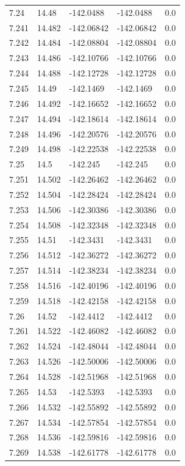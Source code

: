 \begin{tabular}{lllll}
7.24 & 14.48 & -142.0488 & -142.0488 & 0.0 \\
7.241 & 14.482 & -142.06842 & -142.06842 & 0.0 \\
7.242 & 14.484 & -142.08804 & -142.08804 & 0.0 \\
7.243 & 14.486 & -142.10766 & -142.10766 & 0.0 \\
7.244 & 14.488 & -142.12728 & -142.12728 & 0.0 \\
7.245 & 14.49 & -142.1469 & -142.1469 & 0.0 \\
7.246 & 14.492 & -142.16652 & -142.16652 & 0.0 \\
7.247 & 14.494 & -142.18614 & -142.18614 & 0.0 \\
7.248 & 14.496 & -142.20576 & -142.20576 & 0.0 \\
7.249 & 14.498 & -142.22538 & -142.22538 & 0.0 \\
7.25 & 14.5 & -142.245 & -142.245 & 0.0 \\
7.251 & 14.502 & -142.26462 & -142.26462 & 0.0 \\
7.252 & 14.504 & -142.28424 & -142.28424 & 0.0 \\
7.253 & 14.506 & -142.30386 & -142.30386 & 0.0 \\
7.254 & 14.508 & -142.32348 & -142.32348 & 0.0 \\
7.255 & 14.51 & -142.3431 & -142.3431 & 0.0 \\
7.256 & 14.512 & -142.36272 & -142.36272 & 0.0 \\
7.257 & 14.514 & -142.38234 & -142.38234 & 0.0 \\
7.258 & 14.516 & -142.40196 & -142.40196 & 0.0 \\
7.259 & 14.518 & -142.42158 & -142.42158 & 0.0 \\
7.26 & 14.52 & -142.4412 & -142.4412 & 0.0 \\
7.261 & 14.522 & -142.46082 & -142.46082 & 0.0 \\
7.262 & 14.524 & -142.48044 & -142.48044 & 0.0 \\
7.263 & 14.526 & -142.50006 & -142.50006 & 0.0 \\
7.264 & 14.528 & -142.51968 & -142.51968 & 0.0 \\
7.265 & 14.53 & -142.5393 & -142.5393 & 0.0 \\
7.266 & 14.532 & -142.55892 & -142.55892 & 0.0 \\
7.267 & 14.534 & -142.57854 & -142.57854 & 0.0 \\
7.268 & 14.536 & -142.59816 & -142.59816 & 0.0 \\
7.269 & 14.538 & -142.61778 & -142.61778 & 0.0 \\

\end{tabular}
